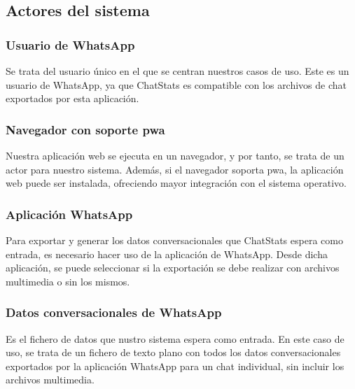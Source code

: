 \subsection{Actores del sistema}
\label{subsec:system-actors}

\subsubsection{Usuario de WhatsApp}

Se trata del usuario único en el que se centran nuestros casos de uso. Este es un usuario de WhatsApp, ya que ChatStats es compatible con los archivos de chat exportados por esta aplicación.

\subsubsection{Navegador con soporte \acrfull{pwa}}

Nuestra aplicación web se ejecuta en un navegador, y por tanto, se trata de un actor para nuestro sistema. Además, si el navegador soporta \acrfull{pwa}, la aplicación web puede ser instalada, ofreciendo mayor integración con el sistema operativo.

\subsubsection{Aplicación WhatsApp}

Para exportar y generar los datos conversacionales que ChatStats espera como entrada, es necesario hacer uso de la aplicación de WhatsApp. Desde dicha aplicación, se puede seleccionar si la exportación se debe realizar con archivos multimedia o sin los mismos.

\subsubsection{Datos conversacionales de WhatsApp}

Es el fichero de datos que nustro sistema espera como entrada. En este caso de uso, se trata de un fichero de texto plano con todos los datos conversacionales exportados por la aplicación WhatsApp para un chat individual, sin incluir los archivos multimedia.

